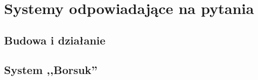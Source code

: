 \documentclass[a4paper, twoside, 12pt]{report}
\begin{document}
\chapter{Systemy odpowiadające na pytania}
    \section{Budowa i działanie}
    \section{System ,,Borsuk''}

\clearpage
{}


\end{document}
